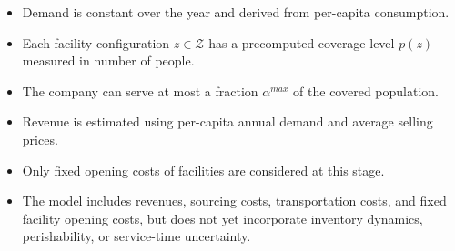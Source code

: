 \documentclass[12pt]{article}
\begin{document}
\begin{itemize}
    \item Demand is constant over the year and derived from per-capita consumption.
    \item Each facility configuration $z \in \mathcal{Z}$ has a precomputed coverage level $p(z)$ measured in number of people.
    \item The company can serve at most a fraction $\alpha^{max}$ of the covered population.
    \item Revenue is estimated using per-capita annual demand and average selling prices.
    \item Only fixed opening costs of facilities are considered at this stage.
    \item The model includes revenues, sourcing costs, transportation costs, and fixed facility opening costs, but does not yet incorporate inventory dynamics, perishability, or service-time uncertainty.
\end{itemize}

\newpage
\end{document}
